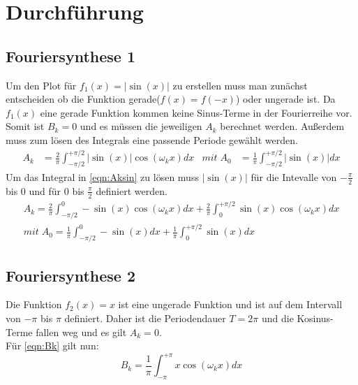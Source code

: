 \newpage
\section{Durchführung}
\subsection{Fouriersynthese 1}
    Um den Plot für $f_1(x) = |\sin(x)|$ zu erstellen muss man zunächst entscheiden ob die Funktion gerade($f(x)=f(-x)$) oder ungerade ist.
    Da $f_1(x)$ eine gerade Funktion kommen keine Sinus-Terme in der Fourierreihe vor.
    Somit ist $B_k = 0$ und es müssen die jeweiligen $A_k$ berechnet werden.
    Außerdem muss zum lösen des Integrals eine passende Periode gewählt werden.
    \begin{align}
        A_k &= \frac{2}{\pi}\int_{-\pi/2}^{+\pi/2} |\sin(x)|\cos(\omega_k x)dx & mit\; A_0 &= \frac{1}{\pi}\int_{-\pi/2}^{+\pi/2} |\sin(x)|dx  \label{eqn:Aksin} 
    \end{align}
    Um das Integral in \eqref{eqn:Aksin} zu lösen muss $|\sin(x)|$ für die Intevalle von $-\frac{\pi}{2}$ bis 0 und für 0 bis $\frac{\pi}{2}$ definiert werden.
    \begin{gather}
        A_k = \frac{2}{\pi}\int_{-\pi/2}^{0} -\sin(x)\cos(\omega_k x)dx + \frac{2}{\pi}\int_{0}^{+\pi/2} \sin(x)\cos(\omega_k x)dx \\
        mit \; A_0 = \frac{1}{\pi}\int_{-\pi/2}^{0} -\sin(x)dx +\frac{1}{\pi}\int_{0}^{+\pi/2} \sin(x)dx
    \end{gather}

\subsection{Fouriersynthese 2}
    Die Funktion $f_2(x) = x$ ist eine ungerade Funktion und ist auf dem Intervall von $-\pi$ bis $\pi$ definiert.
    Daher ist die Periodendauer $T = 2\pi$ und die Kosinus-Terme fallen weg und es gilt $A_k = 0$.\\
    Für \eqref{eqn:Bk} gilt nun:
    \begin{equation}
        B_k = \frac{1}{\pi}\int_{-\pi}^{+\pi} x\cos(\omega_k x)dx
    \end{equation}
\label{sec:Durchführung}
